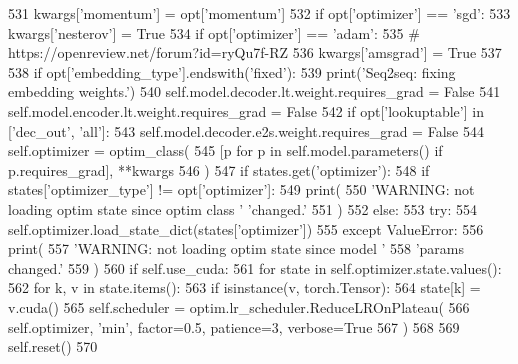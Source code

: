 \begin{DoxyCode}
531                 kwargs[\textcolor{stringliteral}{'momentum'}] = opt[\textcolor{stringliteral}{'momentum'}]
532                 \textcolor{keywordflow}{if} opt[\textcolor{stringliteral}{'optimizer'}] == \textcolor{stringliteral}{'sgd'}:
533                     kwargs[\textcolor{stringliteral}{'nesterov'}] = \textcolor{keyword}{True}
534             \textcolor{keywordflow}{if} opt[\textcolor{stringliteral}{'optimizer'}] == \textcolor{stringliteral}{'adam'}:
535                 \textcolor{comment}{# https://openreview.net/forum?id=ryQu7f-RZ}
536                 kwargs[\textcolor{stringliteral}{'amsgrad'}] = \textcolor{keyword}{True}
537 
538             \textcolor{keywordflow}{if} opt[\textcolor{stringliteral}{'embedding\_type'}].endswith(\textcolor{stringliteral}{'fixed'}):
539                 print(\textcolor{stringliteral}{'Seq2seq: fixing embedding weights.'})
540                 self.model.decoder.lt.weight.requires\_grad = \textcolor{keyword}{False}
541                 self.model.encoder.lt.weight.requires\_grad = \textcolor{keyword}{False}
542                 \textcolor{keywordflow}{if} opt[\textcolor{stringliteral}{'lookuptable'}] \textcolor{keywordflow}{in} [\textcolor{stringliteral}{'dec\_out'}, \textcolor{stringliteral}{'all'}]:
543                     self.model.decoder.e2s.weight.requires\_grad = \textcolor{keyword}{False}
544             self.optimizer = optim\_class(
545                 [p \textcolor{keywordflow}{for} p \textcolor{keywordflow}{in} self.model.parameters() \textcolor{keywordflow}{if} p.requires\_grad], **kwargs
546             )
547             \textcolor{keywordflow}{if} states.get(\textcolor{stringliteral}{'optimizer'}):
548                 \textcolor{keywordflow}{if} states[\textcolor{stringliteral}{'optimizer\_type'}] != opt[\textcolor{stringliteral}{'optimizer'}]:
549                     print(
550                         \textcolor{stringliteral}{'WARNING: not loading optim state since optim class '} \textcolor{stringliteral}{'changed.'}
551                     )
552                 \textcolor{keywordflow}{else}:
553                     \textcolor{keywordflow}{try}:
554                         self.optimizer.load\_state\_dict(states[\textcolor{stringliteral}{'optimizer'}])
555                     \textcolor{keywordflow}{except} ValueError:
556                         print(
557                             \textcolor{stringliteral}{'WARNING: not loading optim state since model '}
558                             \textcolor{stringliteral}{'params changed.'}
559                         )
560                     \textcolor{keywordflow}{if} self.use\_cuda:
561                         \textcolor{keywordflow}{for} state \textcolor{keywordflow}{in} self.optimizer.state.values():
562                             \textcolor{keywordflow}{for} k, v \textcolor{keywordflow}{in} state.items():
563                                 \textcolor{keywordflow}{if} isinstance(v, torch.Tensor):
564                                     state[k] = v.cuda()
565             self.scheduler = optim.lr\_scheduler.ReduceLROnPlateau(
566                 self.optimizer, \textcolor{stringliteral}{'min'}, factor=0.5, patience=3, verbose=\textcolor{keyword}{True}
567             )
568 
569         self.reset()
570 
\end{DoxyCode}


